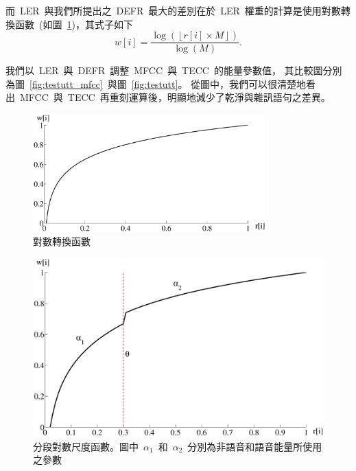 而~LER~與我們所提出之~DEFR~最大的差別在於~LER~權重的計算是使用對數轉換函數~(如圖~\ref{fig:logler})，其式子如下
\begin{equation}
\label{eq:lerweight}
	w[i] = \frac{\log \left( \left \lfloor r[i] \times M \right \rfloor \right)}{\log \left( M \right)}.
\end{equation}

我們以~LER~與~DEFR~調整~MFCC~與~TECC~的能量參數值，
其比較圖分別為圖~\ref{fig:testutt_mfcc}~與圖~\ref{fig:testutt}。
從圖中，我們可以很清楚地看出~MFCC~與~TECC~再重刻運算後，明顯地減少了乾淨與雜訊語句之差異。

\begin{figure}[!htb]
\centering
\includegraphics[width=0.8\textwidth]{figs/logler}
\caption{對數轉換函數} 
\label{fig:logler}
\end{figure}

\begin{figure}[!htb]
\centering
\includegraphics[width=1.0\textwidth]{figs/ler}
\caption{分段對數尺度函數。圖中~$\alpha_1$~和~$\alpha_2$~分別為非語音和語音能量所使用之參數} 
\label{fig:ler}
\end{figure}

